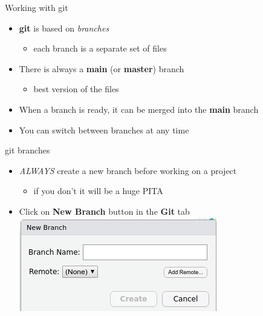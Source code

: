 \documentclass[
  ignorenonframetext,
  aspectratio=169]{beamer}
\providecommand{\tightlist}{%
  \setlength{\itemsep}{0pt}\setlength{\parskip}{0pt}}
\begin{document}
\begin{frame}{Working with git}
\protect\hypertarget{working-with-git}{}
\begin{itemize}
\tightlist
\item
  \textbf{git} is based on \emph{branches}

  \begin{itemize}
  \tightlist
  \item
    each branch is a separate set of files
  \end{itemize}
\item
  There is always a \textbf{main} (or \textbf{master}) branch

  \begin{itemize}
  \tightlist
  \item
    best version of the files
  \end{itemize}
\item
  When a branch is ready, it can be merged into the \textbf{main} branch
\item
  You can switch between branches at any time
\end{itemize}
\end{frame}

\begin{frame}{git branches}
\protect\hypertarget{git-branches}{}
\begin{itemize}
\tightlist
\item
  \emph{ALWAYS} create a new branch before working on a project

  \begin{itemize}
  \tightlist
  \item
    if you don't it will be a huge PITA
  \end{itemize}
\item
  Click on \textbf{New Branch} button in the \textbf{Git} tab
  \includegraphics{figures/new_branch.png}
\end{itemize}
\end{frame}
\end{document}
